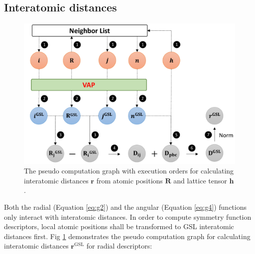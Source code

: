 \documentclass[preprint]{revtex4-2}
\begin{document}
% 
%
\subsection{Interatomic distances}
\label{section:interatomic_distance}

% 
%
\begin{figure}[h!]
\centering
\includegraphics[scale=0.6]{figures/Fig3.pdf}
\caption{\label{fig:Fig3} The pseudo computation graph with execution orders for 
calculating interatomic distances $\mathbf{r}$ from atomic positions 
$\mathbf{R}$ and lattice tensor $\mathbf{h}$.
}
\end{figure}

Both the radial (Equation \ref{eq:g2}) and the angular (Equation \ref{eq:g4}) 
functions only interact with interatomic distances. In order to compute symmetry
function descriptors, local atomic positions shall be transformed to GSL 
interatomic distances first. Fig \ref{fig:Fig3} demonstrates the pseudo 
computation graph for calculating interatomic distances 
$\mathbf{r}^{\mathrm{GSL}}$ for radial descriptors: 
\end{document}
